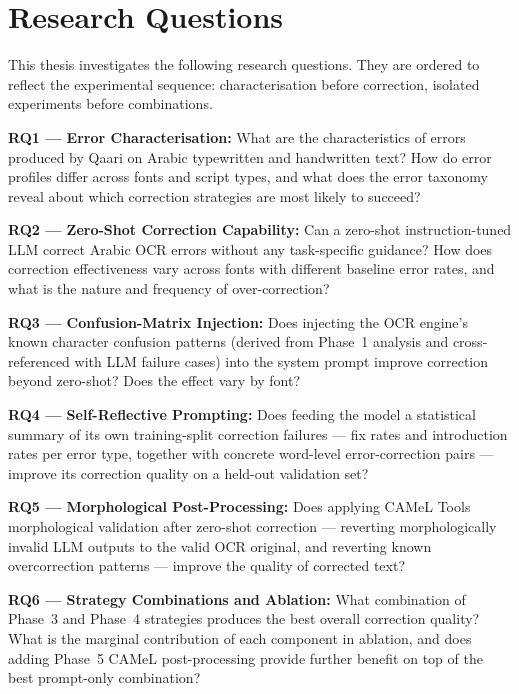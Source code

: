 \section{Research Questions}
\label{sec:intro_rq}

This thesis investigates the following research questions. They are ordered
to reflect the experimental sequence: characterisation before correction,
isolated experiments before combinations.

\textbf{RQ1 --- Error Characterisation:} What are the characteristics of
errors produced by Qaari on Arabic typewritten and handwritten text? How do
error profiles differ across fonts and script types, and what does the error
taxonomy reveal about which correction strategies are most likely to succeed?

\textbf{RQ2 --- Zero-Shot Correction Capability:} Can a zero-shot
instruction-tuned LLM correct Arabic OCR errors without any task-specific
guidance? How does correction effectiveness vary across fonts with different
baseline error rates, and what is the nature and frequency of over-correction?

\textbf{RQ3 --- Confusion-Matrix Injection:} Does injecting the OCR engine's
known character confusion patterns (derived from Phase~1 analysis and
cross-referenced with LLM failure cases) into the system prompt improve
correction beyond zero-shot? Does the effect vary by font?

\textbf{RQ4 --- Self-Reflective Prompting:} Does feeding the model a
statistical summary of its own training-split correction failures --- fix
rates and introduction rates per error type, together with concrete
word-level error-correction pairs --- improve its correction quality on a
held-out validation set?

\textbf{RQ5 --- Morphological Post-Processing:} Does applying CAMeL Tools
morphological validation after zero-shot correction --- reverting
morphologically invalid LLM outputs to the valid OCR original, and reverting
known overcorrection patterns --- improve the quality of corrected text?

\textbf{RQ6 --- Strategy Combinations and Ablation:} What combination of
Phase~3 and Phase~4 strategies produces the best overall correction quality?
What is the marginal contribution of each component in ablation, and does
adding Phase~5 CAMeL post-processing provide further benefit on top of the
best prompt-only combination?

